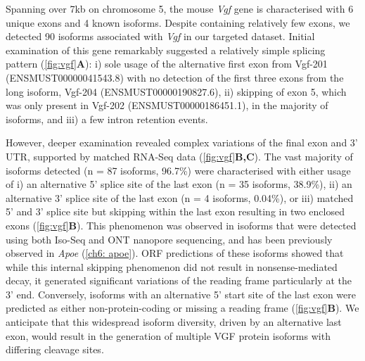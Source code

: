 Spanning over 7kb on chromosome 5, the mouse \textit{Vgf} gene is characterised with 6 unique exons and 4 known isoforms. Despite containing relatively few exons, we detected 90 isoforms associated with \textit{Vgf} in our targeted dataset. Initial examination of this gene  remarkably suggested a relatively simple splicing pattern (\cref{fig:vgf}\textbf{A}): i) sole usage of the alternative first exon from Vgf-201 (ENSMUST00000041543.8) with no detection of the first three exons from the long isoform, Vgf-204 (ENSMUST00000190827.6), ii) skipping of exon 5, which was only present in Vgf-202 (ENSMUST00000186451.1), in the majority of isoforms, and iii) a few intron retention events. 

However, deeper examination revealed complex variations of the final exon and 3' UTR, supported by matched RNA-Seq data (\cref{fig:vgf}\textbf{B,C}). The vast majority of isoforms detected (n = 87 isoforms, 96.7\%) were characterised with either usage of i) an alternative 5' splice site of the last exon (n = 35 isoforms, 38.9\%), ii) an alternative 3' splice site of the last exon (n = 4 isoforms, 0.04\%), or iii) matched 5' and 3' splice site but skipping within the last exon resulting in two enclosed exons (\cref{fig:vgf}\textbf{B}). This phenomenon was observed in isoforms that were detected using both Iso-Seq and ONT nanopore sequencing, and has been previously observed in \textit{Apoe} (\cref{ch6: apoe}). ORF predictions of these isoforms showed that while this internal skipping phenomenon did not result in nonsense-mediated decay, it generated significant variations of the reading frame particularly at the 3' end. Conversely, isoforms with an alternative 5' start site of the last exon were predicted as either non-protein-coding or missing a reading frame (\cref{fig:vgf}\textbf{B}). We anticipate that this widespread isoform diversity, driven by an alternative last exon, would result in the generation of multiple VGF protein isoforms with differing cleavage sites. 

